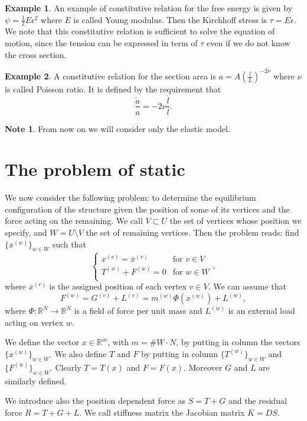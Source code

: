 \documentclass[a4paper,11pt]{article}
\theoremstyle{definition}
\newtheorem*{note}{Note}
\newtheorem*{example}{Example}
\begin{document}
\begin{example}
An example of constitutive relation for the free energy is given by $\psi=\frac{1}{2}E\epsilon^2$ where $E$ is called Young modulus. Then the Kirchhoff stress is $\tau=E\epsilon$. We note that this constitutive relation is sufficient to solve the equation of motion, since the tension can be expressed in term of $\tau$ even if we do not know the cross section.
\end{example}
\begin{example}
A constitutive relation for the section area is $a=A\left(\frac{l}{L}\right)^{-2\nu}$ where $\nu$ is called Poisson ratio. It is defined by the requirement that
\[
\frac{\dot{a}}{a}=-2\nu\frac{\dot{l}}{l}.
\]
\end{example}
\begin{note}
From now on we will consider only the elastic model.
\end{note}

\section{The problem of static}

We now consider the following problem: to determine the equilibrium configuration of the structure given the position of some of its vertices and the force acting on the remaining. We call $V\subset U$ the set of vertices whose position we specify, and $W=U\setminus V$ the set of remaining vertices. Then the problem reads: find $\{x^{(w)}\}_{w\in W}$ such that
\[
\begin{cases}
x^{(v)}=\overline{x}^{(v)} & \text{for $v\in V$} \\
T^{(w)}+F^{(w)}=0 & \text{for $w\in W$} \\
\end{cases},
\]
where $\overline{x}^{(v)}$ is the assigned position of each vertex $v\in V$. We can assume that
\[
F^{(w)}=G^{(v)}+L^{(v)}=m^{(w)}\Phi(x^{(w)})+L^{(w)},
\]
where $\Phi\colon\mathbb{R}^N\to\mathbb{R}^N$ is a field of force per unit mass and $L^{(w)}$ is an external load acting on vertex $w$.

We define the vector $x\in\mathbb{R}^m$, with $m=\#W\cdot N$, by putting in column the vectors $\{x^{(w)}\}_{w\in W}$. We also define $T$ and $F$ by putting in column $\{T^{(w)}\}_{w\in W}$ and $\{F^{(w)}\}_{w\in W}$. Clearly $T=T(x)$ and $F=F(x)$. Moreover $G$ and $L$ are similarly defined.

We introduce also the position dependent force as $S=T+G$ and the residual force $R=T+G+L$. We call stiffness matrix the Jacobian matrix $K=DS$. 
\end{document}
